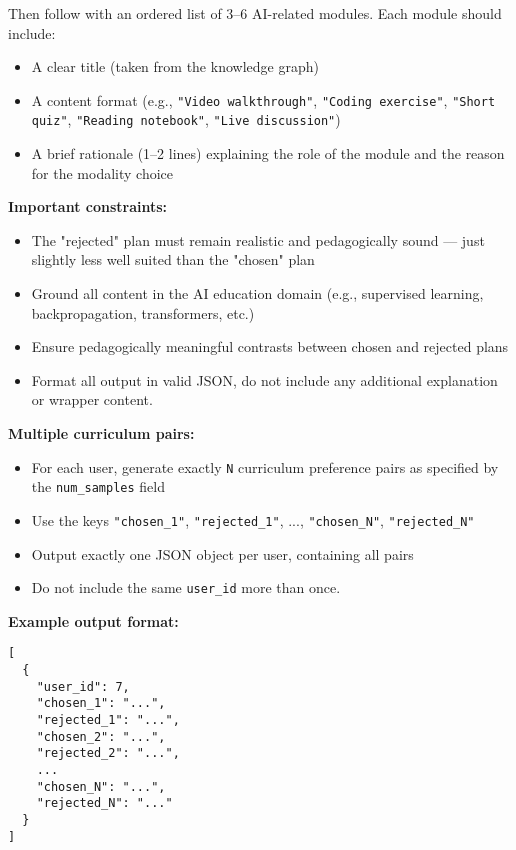 \begin{tcolorbox}[colback=gray!5!white, colframe=black!60!black, title=Prompt: Curriculum Pairs Generation]
{Then follow with an ordered list of 3--6 AI-related modules. Each module should include:
\begin{itemize}
  \item A clear title (taken from the knowledge graph)
  \item A content format (e.g., \texttt{"Video walkthrough"}, \texttt{"Coding exercise"}, \texttt{"Short quiz"}, \texttt{"Reading notebook"}, \texttt{"Live discussion"})
  \item A brief rationale (1--2 lines) explaining the role of the module and the reason for the modality choice
\end{itemize}

\vspace{0.3cm}

\textbf{Important constraints:}
\begin{itemize}
  \item The "rejected" plan must remain realistic and pedagogically sound — just slightly less well suited than the "chosen" plan
  \item Ground all content in the AI education domain (e.g., supervised learning, backpropagation, transformers, etc.)
  \item Ensure pedagogically meaningful contrasts between chosen and rejected plans
  \item Format all output in valid JSON, do not include any additional explanation or wrapper content.
\end{itemize}

\vspace{0.3cm}

\textbf{Multiple curriculum pairs:}
\begin{itemize}
  \item For each user, generate exactly \texttt{N} curriculum preference pairs as specified by the \texttt{num\_samples} field
  \item Use the keys \texttt{"chosen\_1"}, \texttt{"rejected\_1"}, ..., \texttt{"chosen\_N"}, \texttt{"rejected\_N"}
  \item Output exactly one JSON object per user, containing all pairs
  \item Do not include the same \texttt{user\_id} more than once.
\end{itemize}

\vspace{0.3cm}

\textbf{Example output format:}
\begin{verbatim}
[
  {
    "user_id": 7,
    "chosen_1": "...",
    "rejected_1": "...",
    "chosen_2": "...",
    "rejected_2": "...",
    ...
    "chosen_N": "...",
    "rejected_N": "..."
  }
]
\end{verbatim}

}
\end{tcolorbox}

